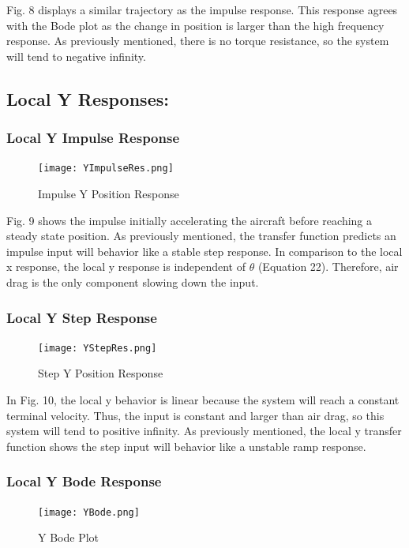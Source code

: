 \documentclass[conference]{IEEEtran}
\begin{document}
Fig. 8 displays a similar trajectory as the impulse response. This response agrees with the Bode plot as the change in position is larger than the high frequency response. As previously mentioned, there is no torque resistance, so the system will tend to negative infinity. \\

\newpage
\subsection{Local Y Responses:}
\subsubsection{Local Y Impulse Response} 
\begin{figure}[htbp]
\centerline{\texttt{[image: YImpulseRes.png]}}
\caption{Impulse Y Position Response}
\label{figure}
\end{figure}

Fig. 9 shows the impulse initially accelerating the aircraft before reaching a steady state position. As previously mentioned, the transfer function predicts an impulse input will behavior like a stable step response. In comparison to the local x response, the local y response is independent of $\theta$ (Equation 22). Therefore, air drag is the only component slowing down the input. \\


\subsubsection{Local Y Step Response} 
\begin{figure}[htbp]
\centerline{\texttt{[image: YStepRes.png]}}
\caption{Step Y Position Response}
\label{figure}
\end{figure}

In Fig. 10, the local y behavior is linear because the system will reach a constant terminal velocity. Thus, the input is constant and larger than air drag, so this system will tend to positive infinity. As previously mentioned, the local y transfer function shows the step input will behavior like a unstable ramp response. 

\newpage
\subsubsection{Local Y Bode Response} 
\begin{figure}[htbp]
\centerline{\texttt{[image: YBode.png]}}
\caption{Y Bode Plot}
\label{figure}
\end{figure}
\end{document}
